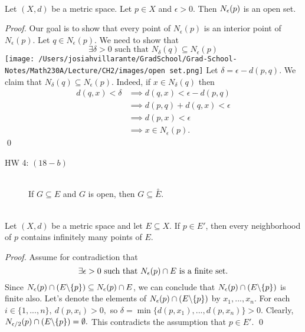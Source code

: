 \begin{theorem} \leavevmode \\
    \label{thm2.19}
    Let $(X,d)$ be a metric space. Let $p \in X$ and $\epsilon > 0$. Then $N_{\epsilon}(p)$ is an open set.
\end{theorem}

\begin{proof}
    Our goal is to show that every point of $N_\epsilon (p)$ is an interior point of $N_\epsilon (p)$.
    Let $q\in N_\epsilon (p)$. We need to show that $$\exists \delta > 0 \text { such that } N_\delta(q) \subseteq N_\epsilon(p)$$
    \texttt{[image: /Users/josiahvillarante/GradSchool/Grad-School-Notes/Math230A/Lecture/CH2/images/open set.png]}
    Let $\delta = \epsilon - d(p,q)$. We claim that $N_\delta (q) \subseteq N_\epsilon (p)$.
    Indeed, if $x\in N_\delta (q)$ then
    \begin{align*}d(q,x) < \delta &\implies d(q,x) < \epsilon - d(p,q) \\ &\implies d(p,q) + d(q,x) < \epsilon \\ &\implies d(p,x)< \epsilon \\ &\implies x\in N_\epsilon(p). \end{align*}
    \qed
\end{proof}

\begin{description}
    \item[HW 4: $(18-b)$] \leavevmode \\
    If $G\subseteq E$ and $G$ is open, then $G \subseteq \overset{\circ}{E}$.
\end{description}

\begin{theorem} \leavevmode \\
    \label{thm2.20}
    Let $(X,d)$ be a metric space and let $E \subseteq X.$ If $p \in E'$, then every neighborhood of $p$ contains infinitely many points of $E$.
\end{theorem}

\begin{proof}
    Assume for contradiction that 
    $$\exists \epsilon > 0 \text{ such that } N_{\epsilon}(p) \cap E \text{ is a finite set.}$$
    Since $N_{\epsilon}(p)\cap \left(E \backslash \{p\}\right) \subseteq N_{\epsilon}(p) \cap E$, we can conclude that $N_{\epsilon}(p)\cap \left(E \backslash \{p\}\right)$ is finite also. Let's denote the elements of $N_{\epsilon}(p)\cap \left(E \backslash \{p\}\right)$ by $x_1, ..., x_n$. For each $i \in \{1,..., n\}, ~d(p, x_i) > 0,$ so $\delta = \min \{d(p, x_1), ..., d(p, x_n)\} > 0.$ Clearly, $N_{\epsilon / 2}(p) \cap \left(E \backslash \{p\}\right) = \emptyset.$ This contradicts the assumption that $p \in E'$.
    \qed
\end{proof}

